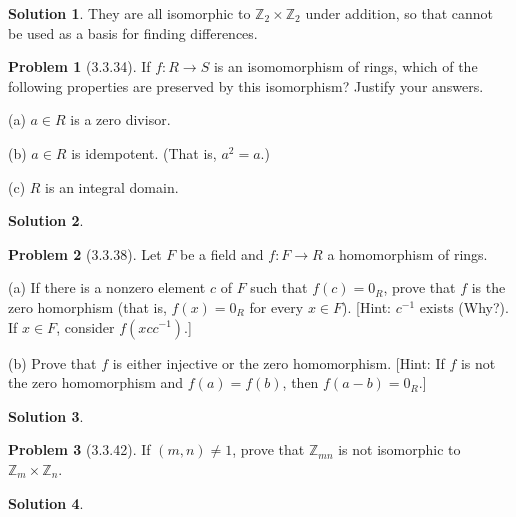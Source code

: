 \documentclass[12pt]{article}
\theoremstyle{definition}
\newtheorem*{prob}{Problem}
\newtheorem*{soln}{Solution}
\newcommand{\ZZ}{{\mathbb{Z}}}
\begin{document}
\begin{soln}

They are all isomorphic to $\ZZ_2\times\ZZ_2$ under addition,
so that cannot be used as a basis for finding differences.


\end{soln}

\begin{prob}[3.3.34]
If  $f:R \to S$ is an isomomorphism of  rings, which of  the following properties are 
preserved by this isomorphism? Justify your answers.     

(a) $a\in R$ is a zero divisor.

(b) $a\in R$ is idempotent. (That is, $a^2=a$.)

(c) $R$ is an integral domain.
\end{prob}

\begin{soln}

\end{soln}

\begin{prob}[3.3.38]
Let $F$ be a field and $f:F \to R$ a homomorphism of  rings.     

(a)   If there is a nonzero element $c$ of  $F$ such that $f(c) = 0_R$, 
prove that $f$ is the zero homorphism (that is, $f(x) = 0_R$ for every $x\in F$). 
[Hint: $c^{-1}$ exists (Why?). If  $x\in F$, consider $f(xcc^{-1})$.]     

(b)   Prove that $f$ is either injective or the zero homomorphism. 
[Hint: If  $f$ is not the zero homomorphism and $f(a) = f(b)$, then $f(a - b) = 0_R$.]
\end{prob}

\begin{soln}

\end{soln}


\begin{prob}[3.3.42]
If  $(m, n) \neq 1$, prove that $\ZZ_{mn}$ is not isomorphic to $\ZZ_m \times \ZZ_n$.
\end{prob}

\begin{soln}

\end{soln}
\end{document}
